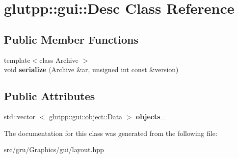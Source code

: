 \hypertarget{classglutpp_1_1gui_1_1Desc}{\section{glutpp\-:\-:gui\-:\-:\-Desc \-Class \-Reference}
\label{classglutpp_1_1gui_1_1Desc}
}
\subsection*{\-Public \-Member \-Functions}
\begin{DoxyCompactItemize}
\item 
\hypertarget{classglutpp_1_1gui_1_1Desc_a81c15eb29042a6eb805ec403876d0a52}{{\footnotesize template$<$class Archive $>$ }\\void {\bfseries serialize} (\-Archive \&ar, unsigned int const \&version)}\label{classglutpp_1_1gui_1_1Desc_a81c15eb29042a6eb805ec403876d0a52}

\end{DoxyCompactItemize}
\subsection*{\-Public \-Attributes}
\begin{DoxyCompactItemize}
\item 
\hypertarget{classglutpp_1_1gui_1_1Desc_a907ddbbcb5e53f1324e6805bd1c62393}{std\-::vector\*
$<$ \hyperlink{classglutpp_1_1gui_1_1object_1_1Data}{glutpp\-::gui\-::object\-::\-Data} $>$ {\bfseries objects\-\_\-}}\label{classglutpp_1_1gui_1_1Desc_a907ddbbcb5e53f1324e6805bd1c62393}

\end{DoxyCompactItemize}


\-The documentation for this class was generated from the following file\-:\begin{DoxyCompactItemize}
\item 
src/gru/\-Graphics/gui/layout.\-hpp\end{DoxyCompactItemize}
